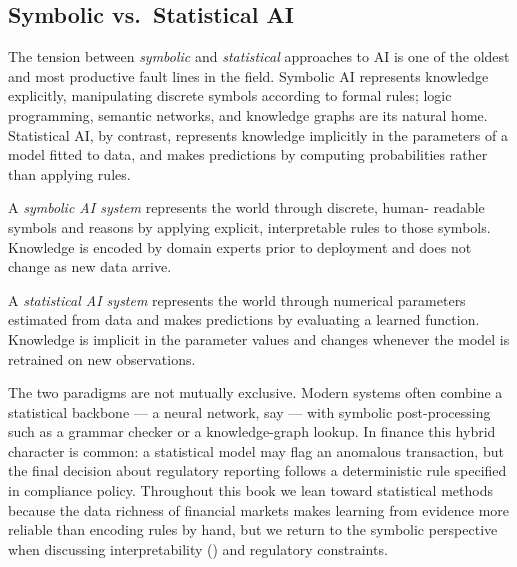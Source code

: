 \subsection{Symbolic vs.\ Statistical AI}
\label{subsec:symbolic-vs-statistical}

The tension between \emph{symbolic} and \emph{statistical} approaches
to AI is one of the oldest and most productive fault lines in the field.
Symbolic AI represents knowledge explicitly, manipulating discrete symbols
according to formal rules; logic programming, semantic networks, and
knowledge graphs are its natural home.  Statistical AI, by contrast,
represents knowledge implicitly in the parameters of a model fitted to
data, and makes predictions by computing probabilities rather than
applying rules.

\begin{definition}[Symbolic AI]
\label{def:symbolic-ai}
A \emph{symbolic AI system} represents the world through discrete, human-
readable symbols and reasons by applying explicit, interpretable rules to
those symbols.  Knowledge is encoded by domain experts prior to deployment
and does not change as new data arrive.
\end{definition}

\begin{definition}[Statistical AI]
\label{def:statistical-ai}
A \emph{statistical AI system} represents the world through numerical
parameters estimated from data and makes predictions by evaluating a
learned function.  Knowledge is implicit in the parameter values and
changes whenever the model is retrained on new observations.
\end{definition}

The two paradigms are not mutually exclusive.  Modern systems often combine
a statistical backbone --- a neural network, say --- with symbolic
post-processing such as a grammar checker or a knowledge-graph lookup.
In finance this hybrid character is common: a statistical model may flag
an anomalous transaction, but the final decision about regulatory reporting
follows a deterministic rule specified in compliance policy.  Throughout
this book we lean toward statistical methods because the data richness of
financial markets makes learning from evidence more reliable than encoding
rules by hand, but we return to the symbolic perspective when discussing
interpretability () and regulatory constraints.

